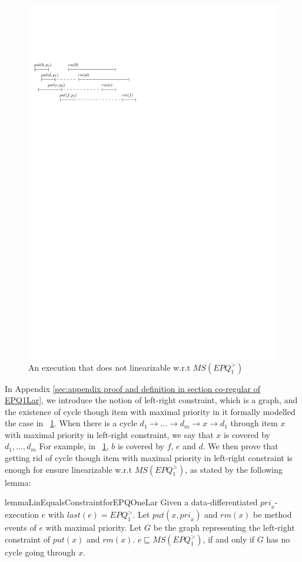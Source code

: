 \begin{figure}[htbp]
  \centering
  \includegraphics[width=0.4 \textwidth]{figures/PIC-HIS-INTRO-GAP-EPQ1L.pdf}
  \caption{An execution that does not linearizable w.r.t $\textit{MS}(\textit{EPQ}_1^{>})$}
  \label{fig:introduce gap for EPQ1Lar}
\end{figure}

In Appendix \ref{sec:appendix proof and definition in section co-regular of EPQ1Lar}, we introduce the notion of left-right constraint, which is a graph, and the existence of cycle though item with maximal priority in it formally modelled the case in \figurename~\ref{fig:introduce gap for EPQ1Lar}. When there is a cycle $d_1 \rightarrow \ldots \rightarrow d_m \rightarrow x \rightarrow d_1$ through item $x$ with maximal priority in left-right constraint, we say that $x$ is covered by $d_1,\ldots,d_m$ For example, in \figurename~\ref{fig:introduce gap for EPQ1Lar}, $b$ is covered by $f$, $e$ and $d$. We then prove that getting rid of cycle though item with maximal priority in left-right constraint is enough for ensure linearizable w.r.t $\textit{MS}(\textit{EPQ}_1^{>})$, as stated by the following lemma:

\begin{restatable}{lemma}{LinEqualsConstraintforEPQOneLar}
\label{lemma:Lin Equals Constraint for EPQ1Lar}
Given a data-differentiated $\textit{pri}_x$-execution $e$ with $\textit{last}(e) = \textit{EPQ}_1^{>}$. Let $\textit{put}(x,\textit{pri}_x)$ and $\textit{rm}(x)$ be method events of $e$ with maximal priority. Let $G$ be the graph representing the left-right constraint of $\textit{put}(x)$ and $\textit{rm}(x)$. $e \sqsubseteq \textit{MS}(\textit{EPQ}_1^{>})$, if and only if $G$ has no cycle going through $x$.
\end{restatable}

